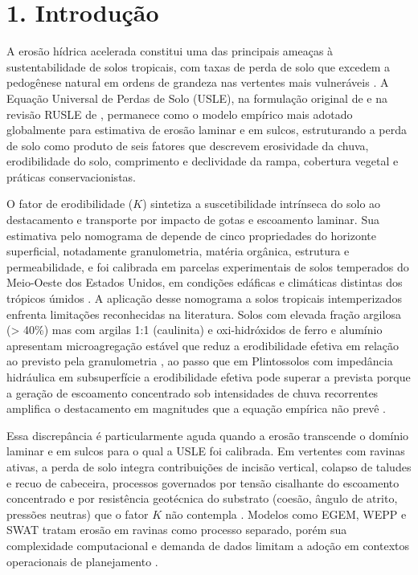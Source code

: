 \documentclass[
  brazilian,
  authoryear,
  preprint]{elsarticle}
\begin{document}
\section{1. Introdução}\label{introduuxe7uxe3o}

A erosão hídrica acelerada constitui uma das principais ameaças à
sustentabilidade de solos tropicais, com taxas de perda de solo que
excedem a pedogênese natural em ordens de grandeza nas vertentes mais
vulneráveis \citep{poesen_2018}. A Equação Universal de Perdas de Solo
(USLE), na formulação original de \citet{wischmeier_smith_1978} e na
revisão RUSLE de \citet{renard_et_al_1997}, permanece como o modelo
empírico mais adotado globalmente para estimativa de erosão laminar e em
sulcos, estruturando a perda de solo como produto de seis fatores que
descrevem erosividade da chuva, erodibilidade do solo, comprimento e
declividade da rampa, cobertura vegetal e práticas conservacionistas.

O fator de erodibilidade (\(K\)) sintetiza a suscetibilidade intrínseca
do solo ao destacamento e transporte por impacto de gotas e escoamento
laminar. Sua estimativa pelo nomograma de \citet{wischmeier_et_al_1971}
depende de cinco propriedades do horizonte superficial, notadamente
granulometria, matéria orgânica, estrutura e permeabilidade, e foi
calibrada em parcelas experimentais de solos temperados do Meio-Oeste
dos Estados Unidos, em condições edáficas e climáticas distintas dos
trópicos úmidos \citep{alewell_et_al_2019}. A aplicação desse nomograma
a solos tropicais intemperizados enfrenta limitações reconhecidas na
literatura. Solos com elevada fração argilosa (\textgreater{} 40\%) mas
com argilas 1:1 (caulinita) e oxi-hidróxidos de ferro e alumínio
apresentam microagregação estável que reduz a erodibilidade efetiva em
relação ao previsto pela granulometria
\citep{silva_et_al_2009, bertoni_lombardi_neto_2017}, ao passo que em
Plintossolos com impedância hidráulica em subsuperfície a erodibilidade
efetiva pode superar a prevista porque a geração de escoamento
concentrado sob intensidades de chuva recorrentes amplifica o
destacamento em magnitudes que a equação empírica não prevê
\citep{poesen_2018, cassol_et_al_2023}.

Essa discrepância é particularmente aguda quando a erosão transcende o
domínio laminar e em sulcos para o qual a USLE foi calibrada. Em
vertentes com ravinas ativas, a perda de solo integra contribuições de
incisão vertical, colapso de taludes e recuo de cabeceira, processos
governados por tensão cisalhante do escoamento concentrado e por
resistência geotécnica do substrato (coesão, ângulo de atrito, pressões
neutras) que o fator \(K\) não contempla
\citep{poesen_et_al_2003, liu_et_al_2021}. Modelos como EGEM, WEPP e
SWAT tratam erosão em ravinas como processo separado, porém sua
complexidade computacional e demanda de dados limitam a adoção em
contextos operacionais de planejamento \citep{alewell_et_al_2019}.
\end{document}
